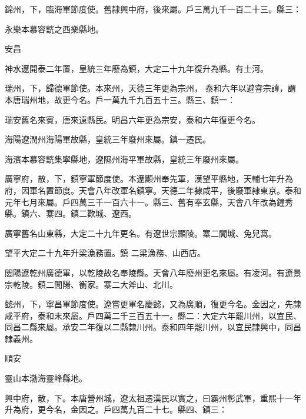 \begin{pinyinscope}
 錦州，下，臨海軍節度使。舊隸興中府，後來屬。戶三萬九千一百二十三。縣三：



 永樂本慕容皝之西樂縣地。



 安昌



 神水遼開泰二年置，皇統三年廢為鎮，大定二十九年復升為縣。有土河。



 瑞州，下，歸德軍節使。本來州，天德三年更為宗州，
 泰和六年以避睿宗諱，謂本唐瑞州地，故更今名。戶一萬九千九百五十三。縣三、鎮一：



 瑞安舊名來賓，唐來遠縣民。明昌六年更為宗安，泰和六年復更今名。



 海陽遼潤州海陽軍故縣，皇統三年廢州來屬。鎮一遷民。



 海濱本慕容皝集寧縣地，遼隰州海平軍故縣，皇統三年廢州來屬。



 廣寧府，散，下，鎮寧軍節度使。本遼顯州奉先軍，漢望平縣地，天輔七年升為府，因軍名置節度。天會八年改軍名鎮寧。天德二年隸咸平，後廢軍隸東京。泰和元年七月來屬。戶四萬三千一百六十一。縣三、舊有奉玄縣，天會八年改為鐘秀縣。鎮六、寨四。鎮二歡城、遼西。



 廣寧舊名山東縣，大定二十九年更名。有遼世宗顯陵。寨二閭城、兔兒窩。



 望平大定二十九年升梁漁務置。鎮
 二梁漁務、山西店。



 閭陽遼乾州廣德軍，以乾陵故名奉陵縣。天會八年廢州更名來屬。有凌河。有遼景宗乾陵。鎮二閭陽、衡家。寨二大斧山、北川。



 懿州，下，寧昌軍節度使。遼嘗更軍名慶懿，又為廣順，復更今名。金因之，先隸咸平府，泰和末來屬。戶四萬二千三百五十一。縣二：大定六年罷川州，以宜民、同昌二縣來屬。承安二年復以二縣隸川州。泰和四年罷川州，以宜民隸興中，同昌隸義州。



 順安



 靈山本渤海靈峰縣地。



 興中府，散，下。本唐營州城，遼太祖遷漢民以實之，曰霸州彰武軍，重熙十一年升為府，更今名，金因之。戶四萬九百二十七。縣四、鎮三：




\end{pinyinscope}
